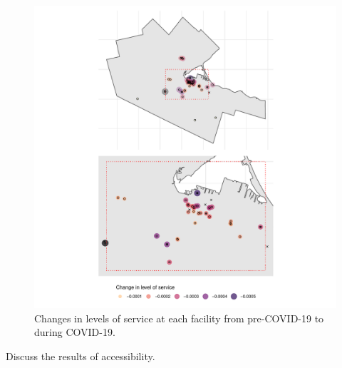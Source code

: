\documentclass[]{elsarticle} %
\begin{document}
\begin{figure}
\includegraphics[width=1\linewidth]{Accessibility-Foodbanks-Hamilton_files/figure-latex/plot-levels-of-service-changes-1} \caption{\label{fig:levels-of-service-changes}Changes in levels of service at each facility from pre-COVID-19 to during COVID-19.}\label{fig:plot-levels-of-service-changes}
\end{figure}

Discuss the results of accessibility.
\end{document}
